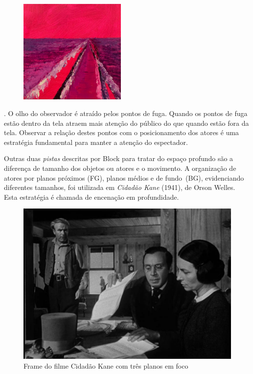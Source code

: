 \begin{figure}
	\caption{}

	\includegraphics[width=2.07143in,height=2.03511in]{figuras/odette-caminho-cor-rosa-2022.pdf.compressed.pdf}
\end{figure}

. O olho do observador
é atraído pelos pontos de fuga. Quando os pontos de fuga estão dentro da
tela atraem mais atenção do público do que quando estão fora da tela.
Observar a relação destes pontos com o posicionamento dos atores é uma
estratégia fundamental para manter a atenção do espectador.

Outras duas \emph{pistas} descritas por Block para tratar do espaço
profundo são a diferença de tamanho dos objetos ou atores e o
movimento. A organização de atores por planos próximos (FG), planos
médios e de fundo~(BG), evidenciando diferentes tamanhos, foi utilizada
em \emph{Cidadão Kane} (1941), de Orson Welles. Esta estratégia é
chamada de encenação em profundidade.

\begin{figure}
	\caption{Frame do filme Cidadão Kane com três planos em foco}
	\includegraphics[width=.6\linewidth]{figuras/frame-cidadao-kane.pdf.compressed.pdf}
\end{figure}

